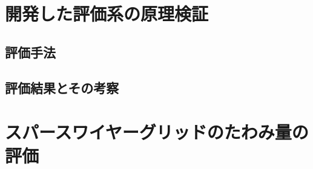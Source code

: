 \documentclass[../../main.tex]{subfiles}
\begin{document}
\section{開発した評価系の原理検証}
\subsection{評価手法}
\subsection{評価結果とその考察}

\section{スパースワイヤーグリッドのたわみ量の評価}
\end{document}
